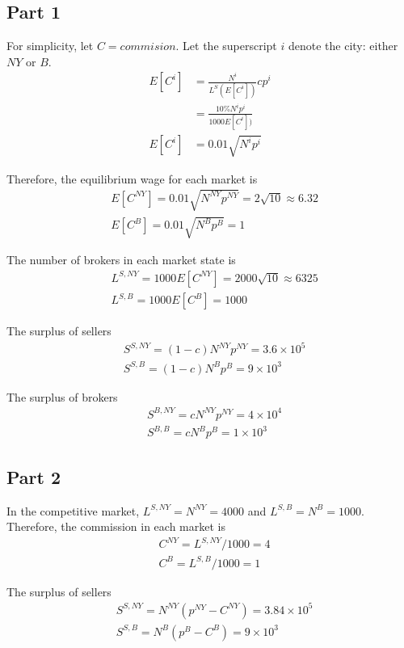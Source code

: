 \documentclass{article}
\begin{document}
\subsection{Part 1}
For simplicity, let $C=commision$. Let the superscript $i$ denote the city: either $NY$ or $B$.
\begin{align*}
	E[C^i]&=\frac{N^i}{L^S(E[C^i])}cp^i\\
	&=\frac{10\%N^ip^i}{1000E[C^i])}\\
	E[C^i]&=0.01\sqrt{N^ip^i}
\end{align*}

Therefore, the equilibrium wage for each market is
\begin{align*}
	&E[C^{NY}]=0.01\sqrt{N^{NY}p^{NY}}=2\sqrt{10}\approx6.32\\
	&E[C^B]=0.01\sqrt{N^Bp^B}=1
\end{align*}

The number of brokers in each market state is
\begin{align*}
	&L^{S,NY}=1000E[C^{NY}]=2000\sqrt{10}\approx6325\\
	&L^{S,B}=1000E[C^B]=1000
\end{align*}

The surplus of sellers
\begin{align*}
	&S^{S,NY}=(1-c)N^{NY}p^{NY}=3.6\times 10^5\\
	&S^{S,B}=(1-c)N^Bp^B=9\times 10^3
\end{align*}

The surplus of brokers
\begin{align*}
	&S^{B,NY}=cN^{NY}p^{NY}=4\times 10^4\\
	&S^{B,B}=cN^Bp^B=1\times 10^3
\end{align*}

\subsection{Part 2}
In the competitive market, $L^{S,NY}=N^{NY}=4000$ and $L^{S,B}=N^B=1000$. Therefore, the commission in each market is
\begin{align*}
	&C^{NY}=L^{S,NY}/1000=4\\
	&C^B=L^{S,B}/1000=1
\end{align*}

The surplus of sellers
\begin{align*}
	&S^{S,NY}=N^{NY}(p^{NY}-C^{NY})=3.84\times 10^5\\
	&S^{S,B}=N^B(p^B-C^B)=9\times 10^3
\end{align*}
\end{document}
